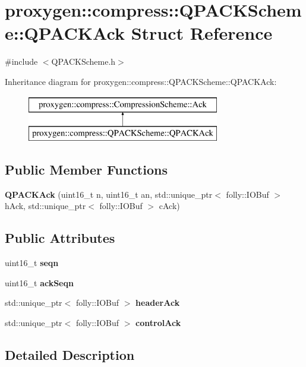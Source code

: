 \section{proxygen\+:\+:compress\+:\+:Q\+P\+A\+C\+K\+Scheme\+:\+:Q\+P\+A\+C\+K\+Ack Struct Reference}
\label{structproxygen_1_1compress_1_1QPACKScheme_1_1QPACKAck}


{\ttfamily \#include $<$Q\+P\+A\+C\+K\+Scheme.\+h$>$}

Inheritance diagram for proxygen\+:\+:compress\+:\+:Q\+P\+A\+C\+K\+Scheme\+:\+:Q\+P\+A\+C\+K\+Ack\+:\begin{figure}[H]
\begin{center}
\leavevmode
\includegraphics[height=2.000000cm]{structproxygen_1_1compress_1_1QPACKScheme_1_1QPACKAck}
\end{center}
\end{figure}
\subsection*{Public Member Functions}
\begin{DoxyCompactItemize}
\item 
{\bf Q\+P\+A\+C\+K\+Ack} (uint16\+\_\+t n, uint16\+\_\+t an, std\+::unique\+\_\+ptr$<$ folly\+::\+I\+O\+Buf $>$ h\+Ack, std\+::unique\+\_\+ptr$<$ folly\+::\+I\+O\+Buf $>$ c\+Ack)
\end{DoxyCompactItemize}
\subsection*{Public Attributes}
\begin{DoxyCompactItemize}
\item 
uint16\+\_\+t {\bf seqn}
\item 
uint16\+\_\+t {\bf ack\+Seqn}
\item 
std\+::unique\+\_\+ptr$<$ folly\+::\+I\+O\+Buf $>$ {\bf header\+Ack}
\item 
std\+::unique\+\_\+ptr$<$ folly\+::\+I\+O\+Buf $>$ {\bf control\+Ack}
\end{DoxyCompactItemize}


\subsection{Detailed Description}


